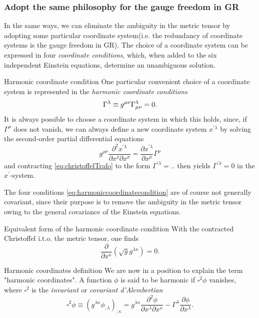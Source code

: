 \subsubsection{Adopt the same philosophy for the gauge freedom in GR}
In the same ways, we can eliminate the ambiguity in the metric tensor by adopting some particular coordinate system(i.e. the redundancy of coordinate systems is the gauge freedom in GR). The choice of a coordinate system can be expressed in four \emph{coordinate conditions}, which, when added to the six independent Einstein equations, determine an unambiguous solution.\\
\begin{mybox}{Harmonic coordinate condition}
	One particular convenient choice of a coordinate system is represented in the \emph{harmonic coordinate conditions}
	\begin{equation}
	\label{eq:harmoniccoordinatecondition}
	\Gamma^\lambda \equiv g^{\mu \nu} \Gamma^\lambda_{\mu \nu} =0.
	\end{equation}
	It is always possible to choose a coordinate system in which this holds, since, if $\Gamma^\rho$ does not vanish, we can always define a new coordinate system $x^{\prime \lambda}$ by solving the second-order partial differential equations
	\begin{equation}
	g^{\rho \sigma} \frac{\partial^2 x^{\prime \lambda}}{\partial x^\rho \partial x^\sigma} = \frac{\partial x^{\prime \lambda}}{\partial x^\rho} \Gamma^\rho
	\end{equation}
	and contracting \ref{eq:christoffelTrafo} to the form $\Gamma^{\prime \lambda} =..$ then yields $\Gamma^{\prime \lambda}=0$ in the $x^\prime$-system.
\end{mybox}
The four conditions \ref{eq:harmoniccoordinatecondition} are of course not generally covariant, since their purpose is to remove the ambiguity in the metric tensor owing to the general covariance of the Einstein equations.
\begin{mybox}{Equivalent form of the harmonic coordinate condition}
	With the contracted Christoffel i.t.o. the metric tensor, one finds
	\begin{equation}
	\label{eq:harmoniccoordinateconditionEquivalent}
	\frac{\partial}{\partial x^\kappa} \left(\sqrt{g} g^{\lambda \kappa}\right)=0.
	\end{equation}
\end{mybox}
\begin{mybox}{Harmonic coordinates definition}
	We are now in a position to explain the term "harmonic coordinates". A function $\phi$ is said to be harmonic if $\square^2 \phi$ vanishes,
	where $\square^2$ is the \emph{invariant} or \emph{covariant d'Alembertian}
	\begin{equation}
	\square^2 \phi \equiv \left(g^{\lambda \kappa} \phi_{;\lambda} \right)_{;\kappa} = g^{\lambda \kappa} \frac{\partial^2 \phi}{\partial x^\lambda \partial x^\kappa} - \Gamma^\lambda \frac{\partial \phi}{\partial x^\lambda}.
	\end{equation}
\end{mybox}
